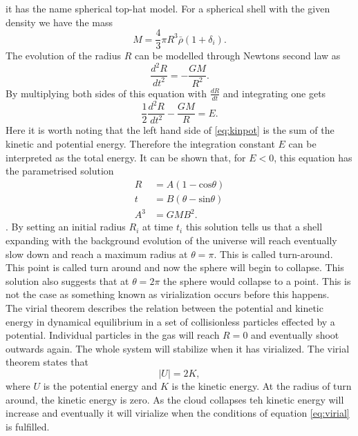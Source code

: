 it has the name spherical top-hat model. For a spherical shell with the given
density we have the mass
\begin{equation}
    M=\frac{4}{3}\pi R^3\bar{\rho}(1+\delta_i).
\end{equation}
The evolution of the radius $R$ can be modelled through Newtons second law as
\begin{equation}
    \frac{d^2R}{dt^2}=-\frac{GM}{R^2}.
\end{equation}
By multiplying both sides of this equation with $\frac{dR}{dt}$ and integrating
one gets
\begin{equation}\label{eq:kinpot}
    \frac{1}{2}\frac{d^2R}{dt^2}-\frac{GM}{R}=E.
\end{equation}
Here it is worth noting that the left hand side of \ref{eq:kinpot} is the sum of
the kinetic and potential energy. Therefore the integration constant $E$ can be
interpreted as the total energy. It can be shown that, for
$E<0$, this equation has the parametrised solution
\begin{align}
    R&=A(1-\mathrm{cos}\theta)\\
    t&=B(\theta-\mathrm{sin}\theta)\\
    A^3&=GMB^2.
\end{align}
\cite[p.~79]{peebles1980}. By setting an initial radius $R_i$ at time $t_i$ this
solution tells us that a shell expanding with the background evolution of the
universe will reach eventually slow down and reach a maximum radius at
$\theta=\pi$. This is called turn-around. This point is called turn around and now the sphere will begin to
collapse. This solution also suggests that at $\theta=2\pi$ the sphere would
collapse to a point. This is not the case as something known as virialization
occurs before this happens.\\\indent
The virial theorem describes the relation between the potential and kinetic
energy in dynamical equilibrium in a set of collisionless particles effected by
a potential. Individual particles in the gas will reach $R=0$ and eventually
shoot outwards again. The whole system will stabilize when it has virialized. The virial theorem states that
\begin{equation}\label{eq:virial}
    \vert U\vert=2K,
\end{equation}
where $U$ is the potential energy and $K$ is the kinetic energy.
At the radius of turn around, the kinetic energy is zero. As the cloud collapses
teh kinetic energy will increase and eventually it will virialize when the
conditions of equation \ref{eq:virial} is fulfilled.
